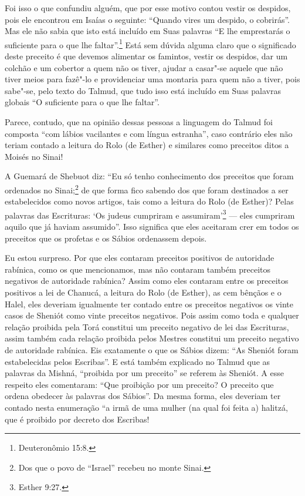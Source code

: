 Foi isso o que confundiu alguém, que por esse motivo contou vestir os
despidos, pois ele encontrou em Isaías o seguinte: ``Quando vires um
despido, o cobrirás''. Mas ele não sabia que isto está incluído em Suas
palavras ``E lhe emprestarás o suficiente para o que lhe faltar''.\footnote{Deuteronômio 15:8.} Está sem dúvida alguma claro que o significado
deste preceito é que devemos alimentar os famintos, vestir os despidos,
dar um colchão e um cobertor a quem não os tiver, ajudar a casar"-se
aquele que não tiver meios para fazê"-lo e providenciar uma montaria
para quem não a tiver, pois sabe"-se, pelo texto do Talmud\starr, que tudo
isso está incluído em Suas palavras globais ``O suficiente para o que
lhe faltar''.

Parece, contudo, que na opinião dessas pessoas a linguagem do Talmud\starr{}
foi composta ``com lábios vacilantes e com língua estranha'', caso
contrário eles não teriam contado a leitura do Rolo (de Esther) e
similares como preceitos ditos a Moisés no Sinai!

A Guemará\starr{} de Shebuot\starr{} diz: ``Eu só tenho conhecimento dos preceitos que foram ordenados no Sinai;\footnote{Dos que o povo de ``Israel'' recebeu no monte Sinai.} de que forma fico sabendo dos que foram
destinados a ser estabelecidos como novos artigos, tais como a leitura
do Rolo
(de Esther)? Pelas palavras das Escrituras: `Os judeus cumpriram e
assumiram'\footnote{Esther 9:27.} --- eles cumpriram aquilo que já haviam
assumido''. Isso significa que eles aceitaram crer em todos os preceitos
que os profetas e os Sábios ordenassem depois.

Eu estou surpreso. Por que eles contaram preceitos positivos de
autoridade rabínica, como os que mencionamos, mas não contaram também
preceitos negativos de autoridade rabínica? Assim como eles contaram
entre os preceitos positivos a lei de Chanucá\starr, a leitura do Rolo (de
Esther), as cem bênçãos e o Halel\starr, eles deveriam igualmente ter
contado entre os preceitos negativos os vinte casos de
Sheniót\starr{} como vinte preceitos negativos. Pois
assim como toda e qualquer relação proibida pela Torá\starr{} constitui um
preceito negativo de lei das Escrituras, assim também cada relação
proibida pelos Mestres constitui um preceito negativo de autoridade
rabínica. Eis exatamente o que os Sábios dizem: ``As
Sheniót\starr{} foram estabelecidas pelos Escribas''. E
está também explicado no Talmud\starr{} que as palavras da Mishná\starr,
``proibida por um preceito'' se referem às Sheniót\starr. A esse respeito
eles comentaram: ``Que proibição por um preceito? O preceito que ordena
obedecer às palavras dos Sábios''. Da mesma forma, eles deveriam ter
contado nesta enumeração ``a irmã de uma mulher (na qual foi feita a)
halitzá\starr, que é proibido por decreto dos Escribas!

